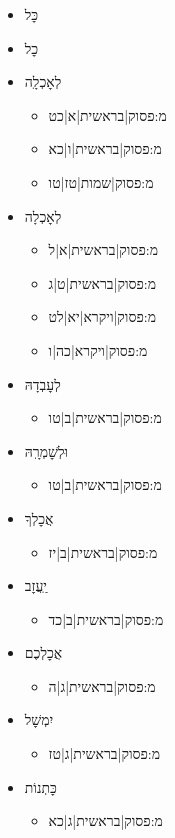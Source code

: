 

\begin{itemize} \item כׇּל
 \item כׇל
 \item לְאׇכְלָֽה
\begin{itemize} \item {{מ:פסוק|בראשית|א|כט}}\item {{מ:פסוק|בראשית|ו|כא}}\item {{מ:פסוק|שמות|טז|טו}}
\end{itemize}
 \item לְאׇכְלָה
\begin{itemize} \item {{מ:פסוק|בראשית|א|ל}}\item {{מ:פסוק|בראשית|ט|ג}}\item {{מ:פסוק|ויקרא|יא|לט}}\item {{מ:פסוק|ויקרא|כה|ו}}
\end{itemize}
 \item לְעׇבְדָהּ
\begin{itemize} \item {{מ:פסוק|בראשית|ב|טו}}
\end{itemize}
 \item וּלְשׇׁמְרָֽהּ
\begin{itemize} \item {{מ:פסוק|בראשית|ב|טו}}
\end{itemize}
 \item אֲכׇלְךָ
\begin{itemize} \item {{מ:פסוק|בראשית|ב|יז}}
\end{itemize}
 \item יַֽעֲזׇב
\begin{itemize} \item {{מ:פסוק|בראשית|ב|כד}}
\end{itemize}
 \item אֲכׇלְכֶם
\begin{itemize} \item {{מ:פסוק|בראשית|ג|ה}}
\end{itemize}
 \item יִמְשׇׁל
\begin{itemize} \item {{מ:פסוק|בראשית|ג|טז}}
\end{itemize}
 \item כׇּתְנוֹת
\begin{itemize} \item {{מ:פסוק|בראשית|ג|כא}}

\end{itemize}
\end{itemize}
